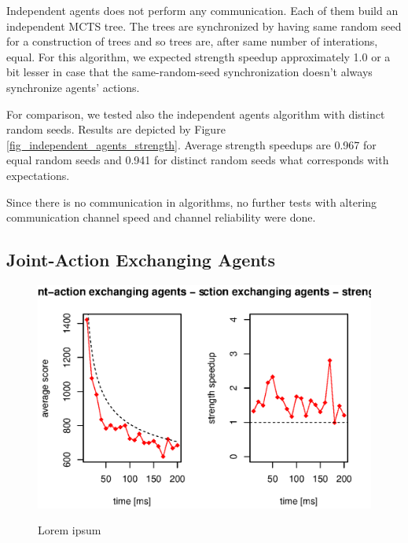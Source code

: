 Independent agents does not perform any communication. Each of them build an independent MCTS
tree. The trees are synchronized by having same random seed for a construction of trees and so
trees are, after same number of interations, equal. For this algorithm, we expected strength
speedup approximately 1.0 or a bit lesser in case that the same-random-seed synchronization
doesn't always synchronize agents' actions.

For comparison, we tested also the independent agents algorithm with distinct random seeds.
Results are depicted by Figure \ref{fig_independent_agents_strength}. Average strength speedups
are 0.967 for equal random seeds and 0.941 for distinct random seeds what corresponds with
expectations.

Since there is no communication in algorithms, no further tests with altering communication
channel speed and channel reliability were done.




\subsection{Joint-Action Exchanging Agents}

\begin{figure}
\begin{center}
\includegraphics{img/move-exchange-strength.eps}
\end{center}
\caption{\footnotesize Lorem ipsum}{\footnotesize }
\label{fig_action_exchanging_strength}
\end{figure}


